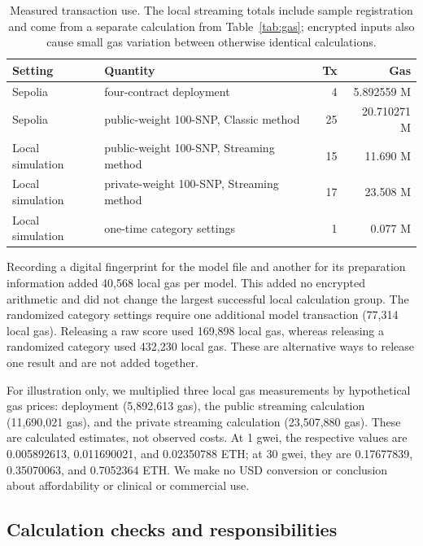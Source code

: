 \documentclass[10pt]{article}
\begin{document}
\begin{table}[ht]
\centering
\caption{Measured transaction use. The local streaming totals include sample
registration and come from a separate calculation from Table~\ref{tab:gas}; encrypted
inputs also cause small gas variation between otherwise identical calculations.}
\label{tab:cost}
\footnotesize
\setlength{\tabcolsep}{2pt}
\begin{tabularx}{\columnwidth}{@{}lXrr@{}}
\toprule
\textbf{Setting} & \textbf{Quantity} & \textbf{Tx} & \textbf{Gas} \\
\midrule
Sepolia & four-contract deployment & 4 & 5.892559 M \\
Sepolia & public-weight 100-SNP, Classic method & 25 & 20.710271 M \\
Local simulation & public-weight 100-SNP, Streaming method & 15 & 11.690 M \\
Local simulation & private-weight 100-SNP, Streaming method & 17 & 23.508 M \\
Local simulation & one-time category settings & 1 & 0.077 M \\
\bottomrule
\end{tabularx}
\end{table}

Recording a digital fingerprint for the model file and another for its preparation information
added 40,568 local gas per model. This added no encrypted arithmetic and did not change the
largest successful local calculation group.  The
randomized category settings require one additional model transaction (77,314 local gas).
Releasing a raw score used 169,898 local gas, whereas releasing a randomized category
used 432,230 local gas. These
are alternative ways to release one result and are not added together.

For illustration only, we multiplied three local gas measurements by hypothetical gas
prices: deployment (5,892,613 gas), the public streaming calculation (11,690,021 gas),
and the private streaming calculation (23,507,880 gas).  These are calculated estimates,
not observed costs.  At 1 gwei, the respective values are 0.005892613, 0.011690021,
and 0.02350788 ETH; at 30 gwei, they are 0.17677839, 0.35070063, and 0.7052364 ETH.
We make no USD conversion or conclusion about affordability or clinical or commercial use.

\subsection{Calculation checks and responsibilities}
\end{document}
